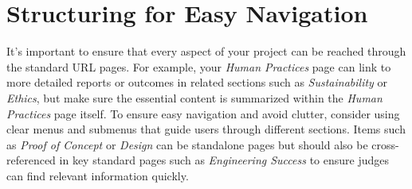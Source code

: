 \section{Structuring for Easy Navigation}

It’s important to ensure that every aspect of your project can be reached through the standard URL pages.
For example, your \textit{Human Practices} page can link to more detailed reports or outcomes in related sections such as \textit{Sustainability} or \textit{Ethics}, but make sure the essential content is summarized within the \textit{Human Practices} page itself. \newline
To ensure easy navigation and avoid clutter, consider using clear menus and submenus that guide users through different sections.
Items such as \textit{Proof of Concept} or \textit{Design} can be standalone pages but should also be cross-referenced in key standard pages such as \textit{Engineering Success} to ensure judges can find relevant information quickly.


